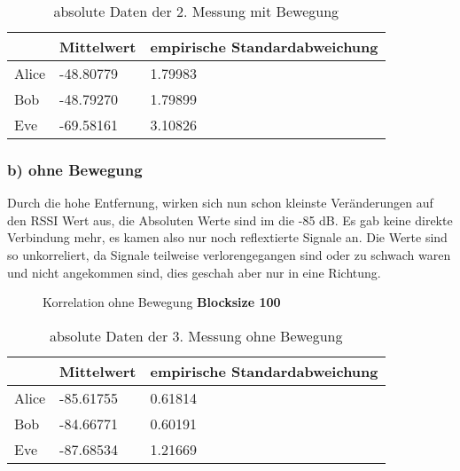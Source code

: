 \documentclass[12pt,a4paper]{article}
\begin{document}
\begin{table}[H]
\centering
\begin{tabular}{l|l|l}
& Mittelwert & empirische Standardabweichung \\
\hline
Alice & -48.80779 & 1.79983 \\
\hline
Bob & -48.79270 & 1.79899 \\
\hline
Eve & -69.58161 & 3.10826 \\
\end{tabular}
\caption{absolute Daten der 2. Messung mit Bewegung}
\end{table}

\subsubsection*{b) ohne Bewegung}
Durch die hohe Entfernung, wirken sich nun schon kleinste Veränderungen auf den RSSI Wert aus, die Absoluten Werte sind im die -85 dB. Es gab keine direkte Verbindung mehr, es kamen also nur noch reflextierte Signale an. Die Werte sind so unkorreliert, da Signale teilweise verlorengegangen sind oder zu schwach waren und nicht angekommen sind, dies geschah aber nur in eine Richtung.

\begin{figure}[H]
\centering
{} \qquad
{}
\caption{Korrelation ohne Bewegung \textbf{Blocksize 100}}
\label{fig:3_b_o}
\end{figure}

\begin{table}[H]
\centering
\begin{tabular}{l|l|l}
& Mittelwert & empirische Standardabweichung \\
\hline
Alice & -85.61755 & 0.61814 \\
\hline
Bob & -84.66771 & 0.60191 \\
\hline
Eve & -87.68534 & 1.21669 \\
\end{tabular}
\caption{absolute Daten der 3. Messung ohne Bewegung}
\end{table}
\end{document}
